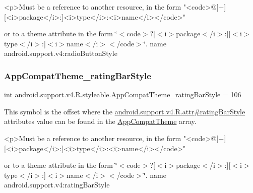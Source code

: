 \begin{DoxyVerb}      <p>Must be a reference to another resource, in the form "<code>@[+][<i>package</i>:]<i>type</i>:<i>name</i></code>"
\end{DoxyVerb}
 or to a theme attribute in the form \char`\"{}$<$code$>$?\mbox{[}$<$i$>$package$<$/i$>$\+:\mbox{]}\mbox{[}$<$i$>$type$<$/i$>$\+:\mbox{]}$<$i$>$name$<$/i$>$$<$/code$>$\char`\"{}.  name android.\+support.\+v4\+:radio\+Button\+Style \mbox{\label{classandroid_1_1support_1_1v4_1_1R_1_1styleable_a217122fd42bd5c2c280789d4142eb012}} 
\subsubsection{\texorpdfstring{App\+Compat\+Theme\+\_\+rating\+Bar\+Style}{AppCompatTheme\_ratingBarStyle}}
{\footnotesize\ttfamily int android.\+support.\+v4.\+R.\+styleable.\+App\+Compat\+Theme\+\_\+rating\+Bar\+Style = 106\hspace{0.3cm}{\ttfamily [static]}}

This symbol is the offset where the \hyperlink{classandroid_1_1support_1_1v4_1_1R_1_1attr_aba190d638db09f1bd63f84b321dcd510}{android.\+support.\+v4.\+R.\+attr\#rating\+Bar\+Style} attribute\textquotesingle{}s value can be found in the \hyperlink{classandroid_1_1support_1_1v4_1_1R_1_1styleable_ac07ebbe62ed977f6dcaadc6397840ace}{App\+Compat\+Theme} array.

\begin{DoxyVerb}      <p>Must be a reference to another resource, in the form "<code>@[+][<i>package</i>:]<i>type</i>:<i>name</i></code>"
\end{DoxyVerb}
 or to a theme attribute in the form \char`\"{}$<$code$>$?\mbox{[}$<$i$>$package$<$/i$>$\+:\mbox{]}\mbox{[}$<$i$>$type$<$/i$>$\+:\mbox{]}$<$i$>$name$<$/i$>$$<$/code$>$\char`\"{}.  name android.\+support.\+v4\+:rating\+Bar\+Style \mbox{\label{classandroid_1_1support_1_1v4_1_1R_1_1styleable_ac0468ac4481514ec954acde9fbd2d3dc}} 
